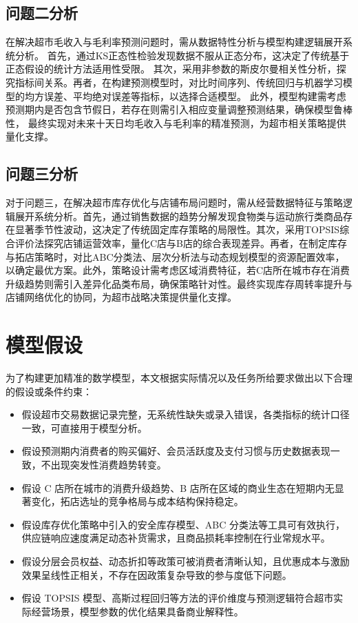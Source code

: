 \documentclass[withoutpreface,bwprint]{cumcmthesis}
\begin{document}
\subsection{问题二分析}	
在解决超市毛收入与毛利率预测问题时，需从数据特性分析与模型构建逻辑展开系统分析。
首先，通过KS正态性检验发现数据不服从正态分布，这决定了传统基于正态假设的统计方法适用性受限。
其次，采用非参数的斯皮尔曼相关性分析，探究指标间关系。再者，在构建预测模型时，对比时间序列、传统回归与机器学习模型的均方误差、平均绝对误差等指标，以选择合适模型。
此外，模型构建需考虑预测期内是否包含节假日，若存在则需引入相应变量调整预测结果，确保模型鲁棒性，
最终实现对未来十天日均毛收入与毛利率的精准预测，为超市相关策略提供量化支撑。

\subsection{问题三分析}
对于问题三，在解决超市库存优化与店铺布局问题时，需从经营数据特征与策略逻辑展开系统分析。首先，通过销售数据的趋势分解发现食物类与运动旅行类商品存在显著季节性波动，这决定了传统固定库存策略的局限性。其次，采用TOPSIS综合评价法探究店铺运营效率，量化C店与B店的综合表现差异。再者，在制定库存与拓店策略时，对比ABC分类法、层次分析法与动态规划模型的资源配置效率，以确定最优方案。此外，策略设计需考虑区域消费特征，若C店所在城市存在消费升级趋势则需引入差异化品类布局，确保策略针对性。最终实现库存周转率提升与店铺网络优化的协同，为超市战略决策提供量化支撑。



\section{模型假设}

为了构建更加精准的数学模型，本文根据实际情况以及任务所给要求做出以下合理的假设或条件约束：

\begin{itemize}[itemindent=2em]
\item 假设超市交易数据记录完整，无系统性缺失或录入错误，各类指标的统计口径一致，可直接用于模型分析。
\item 假设预测期内消费者的购买偏好、会员活跃度及支付习惯与历史数据表现一致，不出现突发性消费趋势转变。
\item 假设 C 店所在城市的消费升级趋势、B 店所在区域的商业生态在短期内无显著变化，拓店选址的竞争格局与成本结构保持稳定。
\item 假设库存优化策略中引入的安全库存模型、ABC 分类法等工具可有效执行，供应链响应速度满足动态补货需求，且商品损耗率控制在行业常规水平。
\item 假设分层会员权益、动态折扣等政策可被消费者清晰认知，且优惠成本与激励效果呈线性正相关，不存在因政策复杂导致的参与度低下问题。
\item 假设 TOPSIS 模型、高斯过程回归等方法的评价维度与预测逻辑符合超市实际经营场景，模型参数的优化结果具备商业解释性。
\end{itemize}
\end{document}

